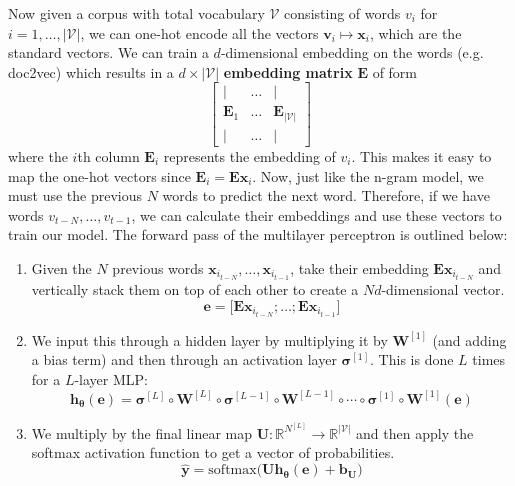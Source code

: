 \documentclass{article}
\begin{document}
    Now given a corpus with total vocabulary $\mathcal{V}$ consisting of words $v_i$ for $i = 1, \ldots, |\mathcal{V}|$, we can one-hot encode all the vectors $\mathbf{v}_i \mapsto \mathbf{x}_i$, which are the standard vectors. We can train a $d$-dimensional embedding on the words (e.g. doc2vec) which results in a $d \times |\mathcal{V}|$ \textbf{embedding matrix} $\mathbf{E}$ of form 
    \[\begin{bmatrix} | & \ldots & | \\ \mathbf{E}_1 & \ldots & \mathbf{E}_{|\mathcal{V}|} \\ | & \ldots & | \end{bmatrix}\]
    where the $i$th column $\mathbf{E}_i$ represents the embedding of $v_i$. This makes it easy to map the one-hot vectors since $\mathbf{E}_i = \mathbf{E} \mathbf{x}_i$. Now, just like the n-gram model, we must use the previous $N$ words to predict the next word. Therefore, if we have words $v_{t - N}, \ldots, v_{t-1}$, we can calculate their embeddings and use these vectors to train our model. The forward pass of the multilayer perceptron is outlined below: 
    \begin{enumerate}
        \item Given the $N$ previous words $\mathbf{x}_{i_{t-N}}, \ldots, \mathbf{x}_{i_{t-1}}$, take their embedding $\mathbf{E} \mathbf{x}_{i_{t-N}}$ and vertically stack them on top of each other to create a $Nd$-dimensional vector. 
        \[\mathbf{e} = \big[ \mathbf{E} \mathbf{x}_{i_{t-N}} ; \ldots ; \mathbf{E} \mathbf{x}_{i_{t-1}} \big] \]

        \item We input this through a hidden layer by multiplying it by $\mathbf{W}^{[1]}$ (and adding a bias term) and then through an activation layer $\boldsymbol{\sigma}^{[1]}$. This is done $L$ times for a $L$-layer MLP: 
        \[\mathbf{h}_{\boldsymbol{\theta}} (\mathbf{e}) = \boldsymbol{\sigma}^{[L]} \circ \mathbf{W}^{[L]} \circ \boldsymbol{\sigma}^{[L-1]} \circ \mathbf{W}^{[L-1]} \circ \cdots \circ \boldsymbol{\sigma}^{[1]} \circ \mathbf{W}^{[1]} (\mathbf{e})\]

        \item We multiply by the final linear map $\mathbf{U}: \mathbb{R}^{N^{[L]}} \rightarrow \mathbb{R}^{|\mathcal{V}|}$ and then apply the softmax activation function to get a vector of probabilities. 
        \[\hat{\mathbf{y}} = \mathrm{softmax} \big( \mathbf{U} \mathbf{h}_{\boldsymbol{\theta}} (\mathbf{e}) + \mathbf{b}_\mathbf{U} \big) \]
    \end{enumerate}
\end{document}
